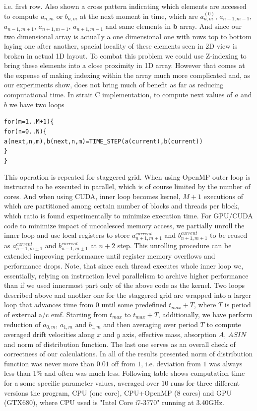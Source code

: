 \documentclass[40pt,letterpaper,physrev]{article}
\begin{document}
	i.e. first row. Also shown a cross pattern indicating which elements are accessed to compute $a_{n,m}$ or $b_{n,m}$ at 
	the next moment in time, which are $a^{(0)}_{n,m}$, $a_{n-1,m-1}$, $a_{n-1,m+1}$, $a_{n+1,m-1}$, $a_{n+1,m-1}$ and 
	same elements in $\mathbf{b}$ array. And since our two dimensional array is actually a one dimensional one with rows 
	top to bottom laying one after another, spacial locality of these elements seen in 2D view is broken in actual 1D layout.
	To combat this problem we could use Z-indexing to bring these elements into a close proximity in 1D array. However that 
	comes at the expense of making indexing within the array much more complicated and, as our experiments show, does not 
	bring much of benefit as far as reducing computational time. In strait C implementation, to compute next values 
	of $a$ and $b$ we have two loops 
	\begin{alltt}
    for( m = 1 .. M+1 ) \{
        for( n = 0 .. N ) \{
            a(next,n,m), b(next,n,m) = TIME_STEP( a(current), b(current) )
        \}
    \}
	\end{alltt}
	This operation is repeated for staggered grid. When using OpenMP outer loop is instructed to be executed in parallel, 
	which is of course limited by the number of cores. And when using CUDA, inner loop becomes kernel, $M+1$ executions of 
	which are partitioned among certain number of blocks and threads per block, which ratio is found experimentally to minimize 
	execution time. For GPU/CUDA code to minimize impact of uncoalesced memory access, we partially unroll the inner loop 
	and use local registers to store $a^{current}_{n+1,m\pm 1}$ and $b^{current}_{n+1,m\pm 1}$ to be reused as
	$a^{current}_{n-1,m\pm 1}$ and $b^{current}_{n-1,m\pm 1}$ at $n+2$ step. This unrolling procedure can be extended 
	improving performance until register memory overflows and performance drops. Note, that since each thread executes 
	whole inner loop we, essentially, relying on instruction level parallelism to archive higher performance than if 
	we used innermost part only of the above code as the kernel. Two loops described above and another one for the staggered grid
	are wrapped into a larger loop that advances time from $0$ until some predefined $t_{max}+T$, where $T$ is period of external
	a/c emf. Starting from $t_{max}$ to $t_{max}+T$, additionally, we have perform reduction of $a_{0,m}$, $a_{1,m}$ and $b_{1,m}$
	and then averaging over period $T$ to compute averaged drift velocities along $x$ and $y$ axis, effective mass, absorption $A$,
	$ASIN$ and norm of distribution function. The last one serves as an overall check of correctness of our calculations. In all
	of the results presented norm of distribution function was never more than $0.01$ off from $1$, i.e. deviation from $1$ was 
	always less than 1\% and often was much less. Following table shows computation time for a some specific parameter values,
	averaged over $10$ runs for three different versions the program, CPU (one core), CPU+OpenMP (8 cores) and GPU (GTX680), 
	where CPU used is "Intel Core i7-3770" running at 3.40GHz.
	
\end{document}
